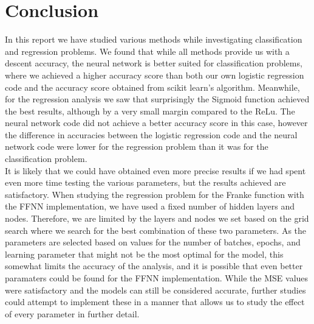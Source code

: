 \documentclass[english,notitlepage,reprint,nofootinbib]{revtex4-2}  %
\begin{document}
\section{Conclusion}\label{sec:conclusion}
In this report we have studied various methods while investigating classification and regression problems. 
We found that while all methods provide us with a descent accuracy, the neural network is better suited for classification problems, where we achieved a higher accuracy score than both our own logistic regression code and the accuracy score obtained from scikit learn's algorithm. Meanwhile, for the regression analysis we saw that surprisingly the Sigmoid function achieved the best results, although by a very small margin compared to the ReLu. The neural network code did not achieve a better accuracy score in this case, however the difference in accuracies between the logistic regression code and the neural network code were lower for the regression problem than it was for the classification problem. 
\vspace{3mm}
\\ 
It is likely that we could have obtained even more precise results if we had spent even more time testing the various parameters, but the results achieved are satisfactory. 
When studying the regression problem for the Franke function with the FFNN implementation, we have used a fixed number of hidden layers and nodes. Therefore, we are limited by the layers and nodes we set based on the grid search where we search for the best combination of these two parameters. As the parameters are selected based on values for the number of batches, epochs, and learning parameter that might not be the most optimal for the model, this somewhat limits the accuracy of the analysis, and it is possible that even better paramaters could be found for the FFNN implementation. While the MSE values were satisfactory and the models can still be considered accurate, further studies could attempt to implement these in a manner that allows us to study the effect of every parameter in further detail. 
\end{document}

